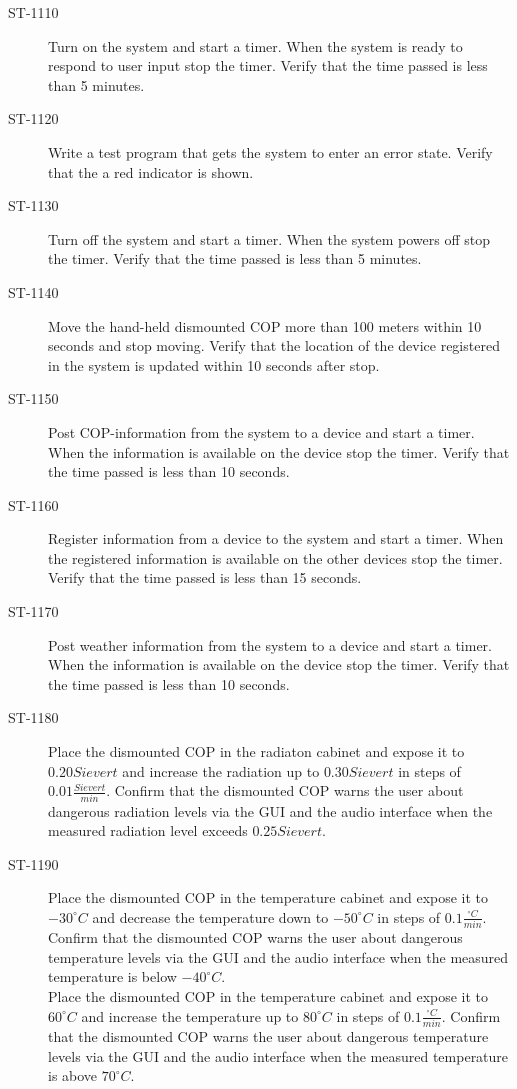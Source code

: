 \begin{description}
\item[ST-1110] Turn on the system and start a timer. When the system is ready to respond to user input stop the timer. Verify that the time passed is less than 5 minutes.

\item[ST-1120]Write a test program that gets the system to enter an error state. Verify that the a red indicator is shown. 

\item[ST-1130] Turn off the system and start a timer. When the system powers off stop the timer. Verify that the time passed is less than 5 minutes.

\item[ST-1140]Move the hand-held dismounted COP more than 100 meters within 10 seconds and stop moving. Verify that the location of the device registered in the system is updated within 10 seconds after stop. 

\item[ST-1150]Post COP-information from the system to a device and start a timer. When the information is available on the device stop the timer. Verify that the time passed is less than 10 seconds. 

\item[ST-1160]Register information from a device to the system and start a timer. When the registered information is available on the other devices stop the timer. Verify that the time passed is less than 15 seconds. 

\item[ST-1170] Post weather information from the system to a device and start a timer. When the information is available on the device stop the timer. Verify that the time passed is less than 10 seconds. 

\item[ST-1180] Place the dismounted COP in the radiaton cabinet and expose it to $0.20 Sievert$ and increase the radiation up to $0.30 Sievert$ in steps of $0.01\frac{Sievert}{min}$. Confirm that the dismounted COP warns the user about dangerous radiation levels via the GUI and the audio interface when the measured radiation level exceeds $0.25 Sievert$. 

\item[ST-1190] Place the dismounted COP in the temperature cabinet and expose it to $-30^{\circ}C$ and decrease the temperature down to $-50^{\circ}C$ in steps of $0.1\frac{^{\circ}C}{min}$. Confirm that the dismounted COP warns the user about dangerous temperature levels via the GUI and the audio interface when the measured temperature is below $-40^{\circ}C$.\\
Place the dismounted COP in the temperature cabinet and expose it to $60^{\circ}C$ and increase the temperature up to $80^{\circ}C$ in steps of $0.1\frac{^{\circ}C}{min}$. Confirm that the dismounted COP warns the user about dangerous temperature levels via the GUI and the audio interface when the measured temperature is above $70^{\circ}C$. 


\end{description}

